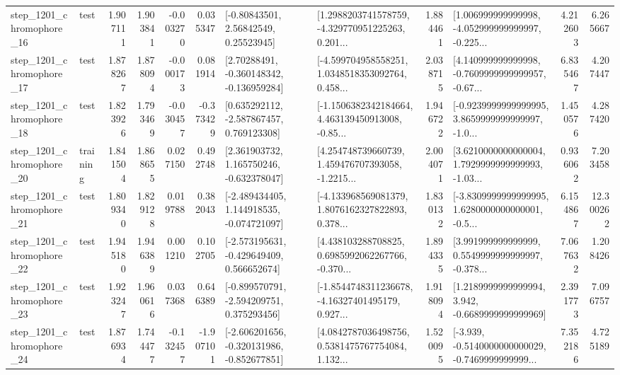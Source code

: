 \begin{tabular}{llrrrrllrlrr}
 step\_1201\_chromophore\_16 &      test &      1.907111 &    1.903841 &     -0.003270 &  0.035347 &       [-0.80843501, 2.56842549, 0.25523945] &  [1.2988203741578759, -4.329770951225263, 0.201... &       1.884461 &  [1.006999999999998, -4.052999999999997, -0.225... &            4.212603 &          6.265667 \\
 step\_1201\_chromophore\_17 &      test &      1.878267 &    1.878094 &     -0.000173 &  0.081914 &    [2.70288491, -0.360148342, -0.136959284] &  [-4.599704958558251, 1.0348518353092764, 0.458... &       2.038715 &  [4.140999999999998, -0.7609999999999957, -0.67... &            6.835467 &          4.207447 \\
 step\_1201\_chromophore\_18 &      test &      1.823926 &    1.793469 &     -0.030457 & -0.373429 &    [0.635292112, -2.587867457, 0.769123308] &  [-1.1506382342184664, 4.463139450913008, -0.85... &       1.946722 &  [-0.9239999999999995, 3.8659999999999997, -1.0... &            1.450576 &          4.287420 \\
 step\_1201\_chromophore\_20 &  training &      1.841504 &    1.868655 &      0.027150 &  0.492748 &    [2.361903732, 1.165750246, -0.632378047] &  [4.254748739660739, 1.459476707393058, -1.2215... &       2.004071 &  [3.6210000000000004, 1.7929999999999993, -1.03... &            0.936062 &          7.203458 \\
 step\_1201\_chromophore\_21 &      test &      1.809340 &    1.829128 &      0.019788 &  0.382043 &   [-2.489434405, 1.144918535, -0.074721097] &  [-4.133968569081379, 1.8076162327822893, 0.378... &       1.830132 &  [-3.8309999999999995, 1.6280000000000001, -0.5... &            6.154867 &         12.300262 \\
 step\_1201\_chromophore\_22 &      test &      1.945180 &    1.946389 &      0.001210 &  0.102705 &   [-2.573195631, -0.429649409, 0.566652674] &  [4.438103288708825, 0.6985992062267766, -0.370... &       1.894335 &  [3.991999999999999, 0.5549999999999997, -0.378... &            7.067632 &          1.208426 \\
 step\_1201\_chromophore\_23 &      test &      1.923247 &    1.960616 &      0.037368 &  0.646389 &   [-0.899570791, -2.594209751, 0.375293456] &  [-1.8544748311236678, -4.16327401495179, 0.927... &       1.918094 &   [1.2189999999999994, 3.942, -0.6689999999999969] &            2.391773 &          7.096757 \\
 step\_1201\_chromophore\_24 &      test &      1.876934 &    1.744477 &     -0.132457 & -1.907101 &  [-2.606201656, -0.320131986, -0.852677851] &  [4.0842787036498756, 0.5381475767754084, 1.132... &       1.520095 &  [-3.939, -0.5140000000000029, -0.7469999999999... &            7.352186 &          4.725189 \\

\end{tabular}
